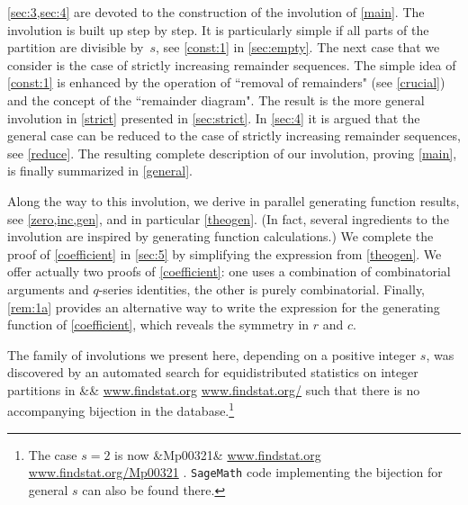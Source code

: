 \documentclass[12pt,reqno]{amsart}
\numberwithin{equation}{section}
\newcommand{\FindStat}[1]{%
  \ifx&#1&%
  \url{www.findstat.org}%
  \else \url{www.findstat.org/#1}%
  \fi}%
\theoremstyle{definition}
\begin{document}
\cref{sec:3,sec:4} are devoted to the construction of 
the involution of \cref{main}. The involution is built up step by step. It is
particularly simple if all parts of the partition are divisible
by~$s$, see \cref{const:1} in \cref{sec:empty}. The next case
that we consider is the case of strictly increasing remainder
sequences. The simple idea of \cref{const:1} is enhanced
by the operation of ``removal of remainders"
(see \cref{crucial}) and the concept of the
``remainder diagram".
The result is the more general involution
in \cref{strict} presented in \cref{sec:strict}.
In \cref{sec:4} it is argued that the general case can be reduced to
the case of strictly increasing remainder sequences, see \cref{reduce}.
The resulting complete description of our involution, proving
\cref{main}, is finally summarized in \cref{general}.

Along the way to this involution, we derive in parallel generating
function results, see \cref{zero,inc,gen}, and in particular
\cref{theogen}. (In fact, several ingredients to the involution are
inspired by generating function calculations.)
We complete the proof of \cref{coefficient} in
\cref{sec:5} by simplifying the expression from \cref{theogen}.
We offer actually two proofs of \cref{coefficient}: one
uses a combination of combinatorial arguments and $q$-series
identities, the other is purely combinatorial.
Finally, \cref{rem:1a} provides an alternative way to write the
expression for the generating function of \cref{coefficient},
which reveals the symmetry in $r$ and $c$.

The family of involutions we present here, depending on a positive
integer $s$, was discovered by an automated search for
equidistributed statistics on integer partitions in \FindStat{} such
that there is no accompanying bijection in the database.\footnote{The
case $s=2$ is now \FindStat{Mp00321}.
{\tt SageMath} code implementing the bijection for general $s$ can also be found there.}
\end{document}
